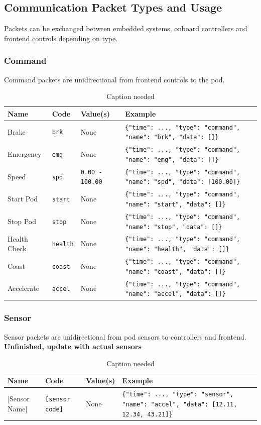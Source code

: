 \documentclass[main.tex]{subfiles}
\begin{document}
    \subsection{Communication Packet Types and Usage}
    Packets can be exchanged between embedded systems, onboard controllers and frontend controls depending on type.
    \subsubsection{Command}
    Command packets are unidirectional from frontend controls to the pod.
    \begin{table}[H]
        \centering
        \begin{tabularx}{\textwidth}{@{}lllX@{}} \toprule
            Name & Code & Value(s) & Example\\ \midrule
            Brake & \texttt{brk} & None & \texttt{\{"time": ..., "type": "command", "name": "brk", "data": []\}}\\
            Emergency & \texttt{emg} & None & \texttt{\{"time": ..., "type": "command", "name": "emg", "data": []\}}\\
            Speed & \texttt{spd} & \texttt{0.00 - 100.00} & \texttt{\{"time": ..., "type": "command", "name": "spd", "data": [100.00]\}}\\
            Start Pod & \texttt{start} & None & \texttt{\{"time": ..., "type": "command", "name": "start", "data": []\}}\\
            Stop Pod & \texttt{stop} & None & \texttt{\{"time": ..., "type": "command", "name": "stop", "data": []\}}\\
            Health Check & \texttt{health} & None & \texttt{\{"time": ..., "type": "command", "name": "health", "data": []\}}\\
            Coast & \texttt{coast} & None & \texttt{\{"time": ..., "type": "command", "name": "coast", "data": []\}}\\
            Accelerate & \texttt{accel} & None & \texttt{\{"time": ..., "type": "command", "name": "accel", "data": []\}}\\ \bottomrule
        \end{tabularx}
        \caption{Caption needed}
    \end{table}

    \subsubsection{Sensor}
    Sensor packets are unidirectional from pod sensors to controllers and frontend. \textbf{Unfinished, update with actual sensors}
    \begin{table}[H]
        \centering
        \begin{tabularx}{\textwidth}{@{}lllX@{}} \toprule
            Name & Code & Value(s) & Example \\ \midrule
            {[Sensor Name]} & \texttt{[sensor code]} & None & \texttt{\{"time": ..., "type": "sensor", "name": "accel", "data": [12.11, 12.34, 43.21]\}} \\ \bottomrule
        \end{tabularx}
        \caption{Caption needed}
    \end{table}
\end{document}
